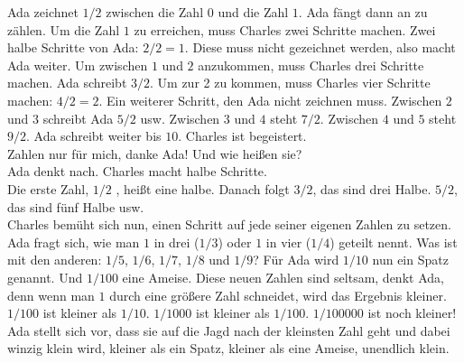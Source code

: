 Ada zeichnet $1/2$ zwischen die Zahl $0$ und die Zahl $1$. Ada fängt dann an zu zählen. Um die Zahl $1$ zu erreichen, muss Charles zwei Schritte machen. Zwei halbe Schritte von Ada: $2/2 = 1$. Diese muss nicht gezeichnet werden, also macht Ada weiter. Um zwischen $1$ und $2$ anzukommen, muss Charles drei Schritte machen. Ada schreibt $3/2$. Um zur 2 zu kommen, muss Charles vier Schritte machen: $4/2 = 2$. Ein weiterer Schritt, den Ada nicht zeichnen muss. Zwischen $2$ und $3$ schreibt Ada $5/2$ usw. Zwischen $3$ und $4$ steht $7/2$. Zwischen $4$ und $5$ steht $9/2$. Ada schreibt weiter bis $10$. 
Charles ist begeistert.\\
\frqq{}Zahlen nur für mich, danke Ada! Und wie heißen sie?\flqq{} \\
Ada denkt nach. Charles macht halbe Schritte.\\
\frqq{}Die erste Zahl, $1/2$ , heißt eine halbe. Danach folgt $3/2$, das sind drei Halbe. $5/2$, das sind fünf Halbe usw.\flqq{} \\
Charles bemüht sich nun, einen Schritt auf jede seiner eigenen Zahlen zu setzen.
Ada fragt sich, wie man $1$ in drei ($1/3$) oder $1$ in vier ($1/4$) geteilt nennt. Was ist mit den anderen: $1/5$, $1/6$, $1/7$, $1/8$ und $1/9$? Für Ada wird $1/10$ nun ein Spatz genannt. Und $1/100$ eine Ameise. 
Diese neuen Zahlen sind seltsam, denkt Ada, denn wenn man $1$ durch eine größere Zahl schneidet, wird das Ergebnis kleiner.
$1/100$ ist kleiner als $1/10$. $1/1000$ ist kleiner als $1/100$. $1/100000$ ist noch kleiner! Ada stellt sich vor, dass sie auf die Jagd nach der kleinsten Zahl geht und dabei winzig klein wird, kleiner als ein Spatz, kleiner als eine Ameise, unendlich klein.

